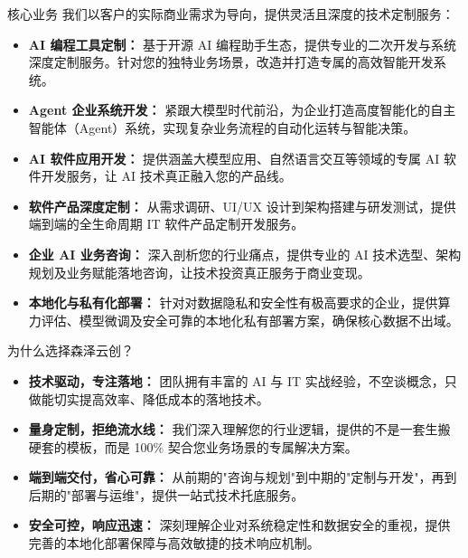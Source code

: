 \documentclass[11pt, a4paper]{article}
\begin{document}
\begin{sectionbox}{核心业务}
\large\color{corpgray}
我们以客户的实际商业需求为导向，提供灵活且深度的技术定制服务：

\vspace{0.5cm}
\begin{itemize}[leftmargin=1.5em, label=\textcolor{corpcyan}{\rule{1.2ex}{1.2ex}}, itemsep=1.5ex]
    \item \textbf{\textcolor{corpblue}{AI 编程工具定制：}} 基于开源 AI 编程助手生态，提供专业的二次开发与系统深度定制服务。针对您的独特业务场景，改造并打造专属的高效智能开发系统。
    \item \textbf{\textcolor{corpblue}{Agent 企业系统开发：}} 紧跟大模型时代前沿，为企业打造高度智能化的自主智能体（Agent）系统，实现复杂业务流程的自动化运转与智能决策。
    \item \textbf{\textcolor{corpblue}{AI 软件应用开发：}} 提供涵盖大模型应用、自然语言交互等领域的专属 AI 软件开发服务，让 AI 技术真正融入您的产品线。
    \item \textbf{\textcolor{corpblue}{软件产品深度定制：}} 从需求调研、UI/UX 设计到架构搭建与研发测试，提供端到端的全生命周期 IT 软件产品定制开发服务。
    \item \textbf{\textcolor{corpblue}{企业 AI 业务咨询：}} 深入剖析您的行业痛点，提供专业的 AI 技术选型、架构规划及业务赋能落地咨询，让技术投资真正服务于商业变现。
    \item \textbf{\textcolor{corpblue}{本地化与私有化部署：}} 针对对数据隐私和安全性有极高要求的企业，提供算力评估、模型微调及安全可靠的本地化私有部署方案，确保核心数据不出域。
\end{itemize}
\end{sectionbox}

\begin{sectionbox}{为什么选择森泽云创？}
\large\color{corpgray}
\begin{itemize}[leftmargin=1.5em, label=\textcolor{corpcyan}{\Large $\bullet$}, itemsep=1.5ex]
    \item \textbf{\textcolor{corpblue}{技术驱动，专注落地：}} 团队拥有丰富的 AI 与 IT 实战经验，不空谈概念，只做能切实提高效率、降低成本的落地技术。
    \item \textbf{\textcolor{corpblue}{量身定制，拒绝流水线：}} 我们深入理解您的行业逻辑，提供的不是一套生搬硬套的模板，而是 100\% 契合您业务场景的专属解决方案。
    \item \textbf{\textcolor{corpblue}{端到端交付，省心可靠：}} 从前期的"咨询与规划"到中期的"定制与开发"，再到后期的"部署与运维"，提供一站式技术托底服务。
    \item \textbf{\textcolor{corpblue}{安全可控，响应迅速：}} 深刻理解企业对系统稳定性和数据安全的重视，提供完善的本地化部署保障与高效敏捷的技术响应机制。
\end{itemize}
\end{sectionbox}
\end{document}
